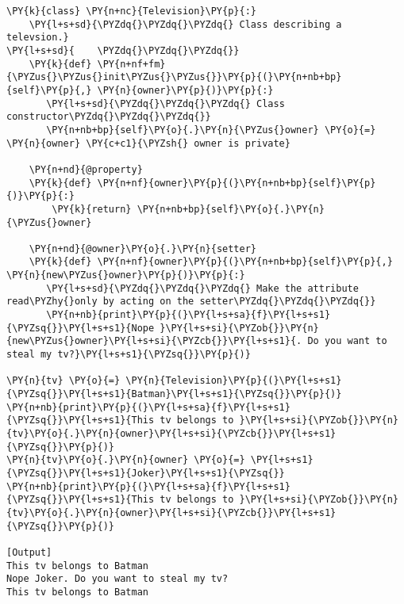\begin{Verbatim}[label=\makebox{\url{https://github.com/lucabaldini/cmepda/tree/master/slides/latex/snippets/class\_tv\_encapsulation\_properties.py}},commandchars=\\\{\}]
\PY{k}{class} \PY{n+nc}{Television}\PY{p}{:}
    \PY{l+s+sd}{\PYZdq{}\PYZdq{}\PYZdq{} Class describing a televsion.}
\PY{l+s+sd}{    \PYZdq{}\PYZdq{}\PYZdq{}}
    \PY{k}{def} \PY{n+nf+fm}{\PYZus{}\PYZus{}init\PYZus{}\PYZus{}}\PY{p}{(}\PY{n+nb+bp}{self}\PY{p}{,} \PY{n}{owner}\PY{p}{)}\PY{p}{:}
       \PY{l+s+sd}{\PYZdq{}\PYZdq{}\PYZdq{} Class constructor\PYZdq{}\PYZdq{}\PYZdq{}}
       \PY{n+nb+bp}{self}\PY{o}{.}\PY{n}{\PYZus{}owner} \PY{o}{=} \PY{n}{owner} \PY{c+c1}{\PYZsh{} owner is private}

    \PY{n+nd}{@property}
    \PY{k}{def} \PY{n+nf}{owner}\PY{p}{(}\PY{n+nb+bp}{self}\PY{p}{)}\PY{p}{:}
        \PY{k}{return} \PY{n+nb+bp}{self}\PY{o}{.}\PY{n}{\PYZus{}owner}

    \PY{n+nd}{@owner}\PY{o}{.}\PY{n}{setter}
    \PY{k}{def} \PY{n+nf}{owner}\PY{p}{(}\PY{n+nb+bp}{self}\PY{p}{,} \PY{n}{new\PYZus{}owner}\PY{p}{)}\PY{p}{:}
       \PY{l+s+sd}{\PYZdq{}\PYZdq{}\PYZdq{} Make the attribute read\PYZhy{}only by acting on the setter\PYZdq{}\PYZdq{}\PYZdq{}}
       \PY{n+nb}{print}\PY{p}{(}\PY{l+s+sa}{f}\PY{l+s+s1}{\PYZsq{}}\PY{l+s+s1}{Nope }\PY{l+s+si}{\PYZob{}}\PY{n}{new\PYZus{}owner}\PY{l+s+si}{\PYZcb{}}\PY{l+s+s1}{. Do you want to steal my tv?}\PY{l+s+s1}{\PYZsq{}}\PY{p}{)}

\PY{n}{tv} \PY{o}{=} \PY{n}{Television}\PY{p}{(}\PY{l+s+s1}{\PYZsq{}}\PY{l+s+s1}{Batman}\PY{l+s+s1}{\PYZsq{}}\PY{p}{)}
\PY{n+nb}{print}\PY{p}{(}\PY{l+s+sa}{f}\PY{l+s+s1}{\PYZsq{}}\PY{l+s+s1}{This tv belongs to }\PY{l+s+si}{\PYZob{}}\PY{n}{tv}\PY{o}{.}\PY{n}{owner}\PY{l+s+si}{\PYZcb{}}\PY{l+s+s1}{\PYZsq{}}\PY{p}{)}
\PY{n}{tv}\PY{o}{.}\PY{n}{owner} \PY{o}{=} \PY{l+s+s1}{\PYZsq{}}\PY{l+s+s1}{Joker}\PY{l+s+s1}{\PYZsq{}}
\PY{n+nb}{print}\PY{p}{(}\PY{l+s+sa}{f}\PY{l+s+s1}{\PYZsq{}}\PY{l+s+s1}{This tv belongs to }\PY{l+s+si}{\PYZob{}}\PY{n}{tv}\PY{o}{.}\PY{n}{owner}\PY{l+s+si}{\PYZcb{}}\PY{l+s+s1}{\PYZsq{}}\PY{p}{)}

[Output]
This tv belongs to Batman
Nope Joker. Do you want to steal my tv?
This tv belongs to Batman
\end{Verbatim}